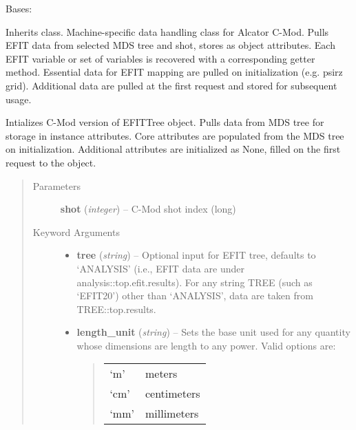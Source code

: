 \documentclass[letterpaper,10pt,english]{sphinxmanual}
\begin{document}
\begin{fulllineitems}
\label{eqtools:eqtools.CModEFIT.CModEFITTree}
Bases: {\hyperref[eqtools:eqtools.EFIT.EFITTree]{}}

Inherits  class. Machine-specific data
handling class for Alcator C-Mod. Pulls EFIT data from selected MDS tree
and shot, stores as object attributes. Each EFIT variable or set of
variables is recovered with a corresponding getter method. Essential data
for EFIT mapping are pulled on initialization (e.g. psirz grid). Additional
data are pulled at the first request and stored for subsequent usage.

Intializes C-Mod version of EFITTree object.  Pulls data from MDS tree for storage
in instance attributes.  Core attributes are populated from the MDS tree on initialization.
Additional attributes are initialized as None, filled on the first request to the object.
\begin{quote}\begin{description}
\item[{Parameters}] \leavevmode
\textbf{shot} (\emph{integer}) --
C-Mod shot index (long)

\item[{Keyword Arguments}] \leavevmode\begin{itemize}
\item {} 
\textbf{tree} (\emph{string}) --
Optional input for EFIT tree, defaults to `ANALYSIS'
(i.e., EFIT data are under analysis::top.efit.results).
For any string TREE (such as `EFIT20') other than `ANALYSIS',
data are taken from TREE::top.results.

\item {} 
\textbf{length\_unit} (\emph{string}) --
Sets the base unit used for any quantity whose
dimensions are length to any power. Valid options are:
\begin{quote}

\begin{tabulary}{\linewidth}{|L|L|}
\hline

`m'
 & 
meters
\\

`cm'
 & 
centimeters
\\

`mm'
 & 
millimeters
\\


\end{tabulary}
\end{quote}
\end{itemize}
\end{description}
\end{quote}
\end{fulllineitems}
\end{document}
